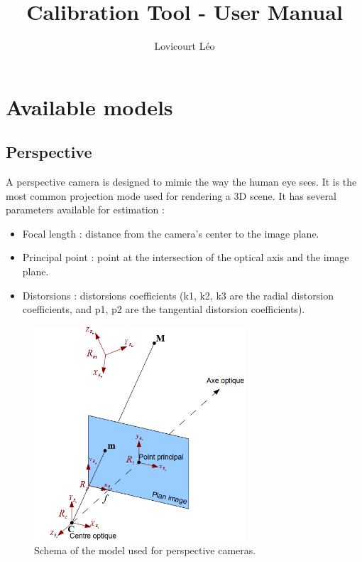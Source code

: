 \documentclass{article}
\title{Calibration Tool - User Manual}
\author{Lovicourt Léo}
\begin{document}
\maketitle


\section{Available models}

\subsection{Perspective}

A perspective camera is designed to mimic the way the human eye sees. It is the most common projection mode used for rendering a 3D scene. It has several parameters available for estimation :

\begin{itemize}
    \item Focal length : distance from the camera's center to the image plane.
    \item Principal point : point at the intersection of the optical axis and the image plane.
    \item Distorsions : distorsions coefficients (k1, k2, k3 are the radial distorsion coefficients, and p1, p2 are the tangential distorsion coefficients). 
\end{itemize}

\begin{figure}[H]
\centering
\includegraphics[width=0.7\textwidth]{stenope_schema.png}
\caption{\label{fig:stenope_schema}Schema of the model used for perspective cameras.}
\end{figure}
\end{document}
